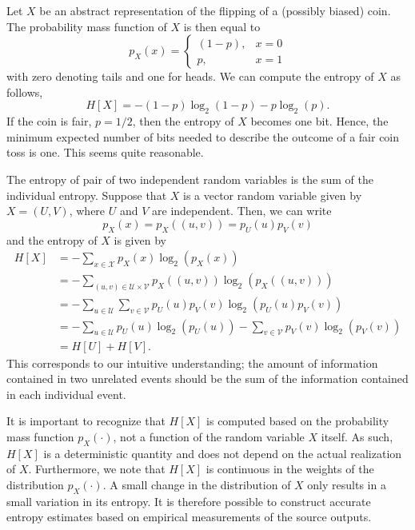 \begin{example} \label{example:EntropyFairCoin}
Let $X$ be an abstract representation of the flipping of a (possibly biased) coin.
The probability mass function of $X$ is then equal to
\begin{equation*}
p_X(x) = \begin{cases} (1-p), & x = 0 \\
p, & x = 1 \end{cases}
\end{equation*}
with zero denoting tails and one for heads.
We can compute the entropy of $X$ as follows,
\begin{equation*}
H[X] = - (1-p) \log_2 (1-p)
- p \log_2 (p) .
\end{equation*}
If the coin is fair, $p = 1/2$, then the entropy of $X$ becomes one  bit.
Hence, the minimum expected number of bits needed to describe the outcome of a fair coin toss is one.
This seems quite reasonable.
\end{example}

The entropy of pair of two independent random variables is the sum of the individual entropy.
Suppose that $X$ is a vector random variable given by $X = (U, V)$, where $U$ and $V$ are independent.
Then, we can write
\begin{equation*}
p_X(x) = p_X((u, v)) = p_{U} (u) p_{V} (v)
\end{equation*}
and the entropy of $X$ is given by
\begin{equation*}
\begin{split}
H[X] &= - \sum_{ x \in \mathcal{X} } p_X(x) \log_2 ( p_X(x) ) \\
&= - \sum_{(u, v) \in \mathcal{U} \times \mathcal{V}}
p_X((u, v)) \log_2 ( p_X((u, v)) ) \\
&= - \sum_{u \in \mathcal{U}} \sum_{v \in \mathcal{V}}
p_{U} (u) p_{V} (v) \log_2 ( p_{U} (u) p_{V} (v) ) \\
&= - \sum_{u \in \mathcal{U}}
p_{U} (u) \log_2 ( p_{U} (u) )
- \sum_{v \in \mathcal{V}}
p_{V} (v) \log_2 ( p_{V} (v) ) \\
&= H[U] + H[V] .
\end{split}
\end{equation*}
This corresponds to our intuitive understanding; the amount of information contained in two unrelated events should be the sum of the information contained in each individual event.

It is important to recognize that $H[X]$ is computed based on the probability mass function $p_X(\cdot)$, not a function of the random variable $X$ itself.
As such, $H[X]$ is a deterministic quantity and does not depend on the actual realization of $X$.
Furthermore, we note that $H[X]$ is continuous in the weights of the distribution $p_X(\cdot)$.
A small change in the distribution of $X$ only results in a small variation in its entropy.
It is therefore possible to construct accurate entropy estimates based on empirical measurements of the source outputs.


